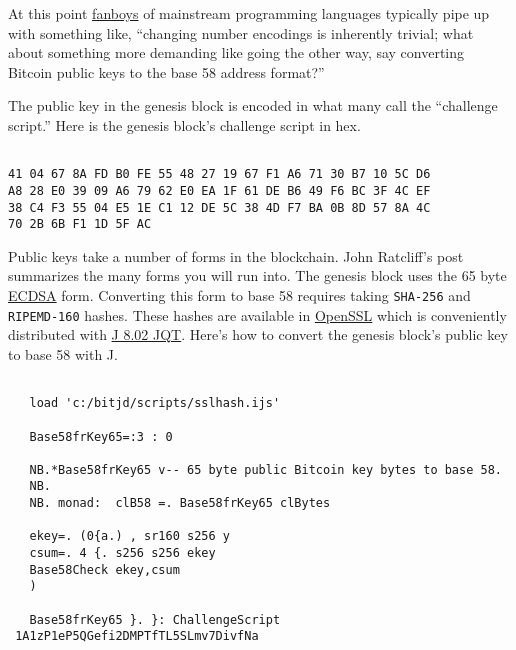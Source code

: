 At this point
\href{http://www.urbandictionary.com/define.php?term=fanboy}{fanboys} of
mainstream programming languages typically pipe up with something like,
``changing number encodings is inherently trivial; what about something
more demanding like going the other way, say converting Bitcoin public
keys to the base 58 address format?''

The public key in the genesis block is encoded in what many call the
``challenge script.'' Here is the genesis block's challenge script in
hex.

\begin{lstlisting}[language=jdoc, frame=single,framerule=0pt,label=lst:scr4754X0d]

41 04 67 8A FD B0 FE 55 48 27 19 67 F1 A6 71 30 B7 10 5C D6 
A8 28 E0 39 09 A6 79 62 E0 EA 1F 61 DE B6 49 F6 BC 3F 4C EF 
38 C4 F3 55 04 E5 1E C1 12 DE 5C 38 4D F7 BA 0B 8D 57 8A 4C 
70 2B 6B F1 1D 5F AC 
\end{lstlisting}

Public keys take a number of forms in the blockchain. John Ratcliff's
post summarizes the many forms you will run into. The genesis block uses
the 65 byte
\href{http://blog.cloudflare.com/ecdsa-the-digital-signature-algorithm-of-a-better-internet}{ECDSA}
form. Converting this form to base 58 requires taking \texttt{SHA-256}
and \texttt{RIPEMD-160} hashes. These hashes are available in
\href{http://www.openssl.org/}{OpenSSL} which is conveniently
distributed with
\href{http://www.jsoftware.com/jwiki/Guides/Qt\%20IDE/Install}{J 8.02
JQT}. Here's how to convert the genesis block's public key to base 58
with J.

\begin{lstlisting}[language=jdoc, frame=single,framerule=0pt,label=lst:scr4754X0e]

   load 'c:/bitjd/scripts/sslhash.ijs'

   Base58frKey65=:3 : 0

   NB.*Base58frKey65 v-- 65 byte public Bitcoin key bytes to base 58.
   NB.
   NB. monad:  clB58 =. Base58frKey65 clBytes

   ekey=. (0{a.) , sr160 s256 y
   csum=. 4 {. s256 s256 ekey
   Base58Check ekey,csum
   )

   Base58frKey65 }. }: ChallengeScript
 1A1zP1eP5QGefi2DMPTfTL5SLmv7DivfNa
\end{lstlisting}

